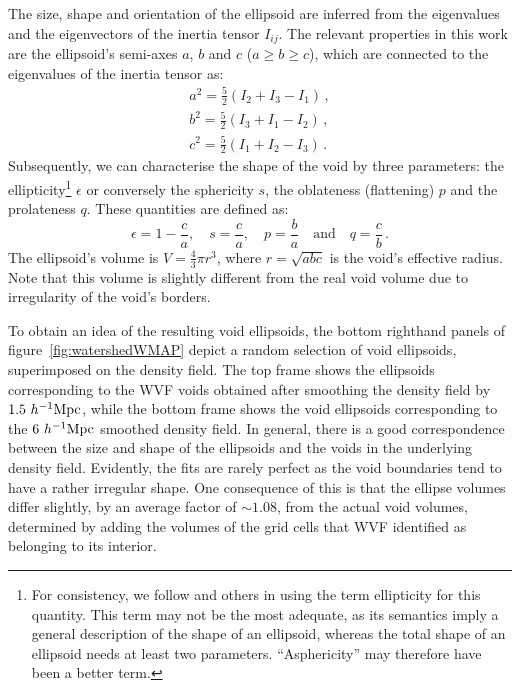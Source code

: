 The size, shape and orientation of the ellipsoid are inferred from the eigenvalues and the eigenvectors 
of the inertia tensor $I_{ij}$. The relevant properties in this work are the ellipsoid's semi-axes $a$, $b$ and $c$
($a \geq b \geq c$), which are connected to the eigenvalues of the inertia tensor as:
\begin{align}
a^2 = \frac{5}{2}\left(I_2 + I_3 - I_1\right) \,,\\
b^2 = \frac{5}{2}\left(I_3 + I_1 - I_2\right) \,,\\
c^2 = \frac{5}{2}\left(I_1 + I_2 - I_3\right) \,.
\end{align}
Subsequently, we can characterise the shape of the void by three parameters: the ellipticity\footnote{For consistency, we 
follow \citet{parklee07} and others in using the term ellipticity for this quantity. This term may not be the most adequate, 
as its semantics imply a general description of the shape of an ellipsoid, whereas the total shape of an ellipsoid needs at 
least two parameters. ``Asphericity'' may therefore have been a better term.} $\epsilon$ or conversely the sphericity $s$, the 
oblateness (flattening) $p$ and the prolateness $q$. These quantities are defined as:
\begin{equation}
\label{eqn:shape_parameters}
\epsilon = 1 - \frac{c}{a}\mathrm{,} \quad s = \frac{c}{a}\mathrm{,} \quad p = \frac{b}{a} \quad \mathrm{and} \quad q = \frac{c}{b} \,.
\end{equation}
The ellipsoid's volume is $V = \frac{4}{3} \pi r^3$, where $r = \sqrt{abc}$ is the void's effective radius. Note that this volume 
is slightly different from the real void volume due to irregularity of the void's borders.

To obtain an idea of the resulting void ellipsoids, the bottom righthand panels of figure~\ref{fig:watershedWMAP} depict a random selection 
of void ellipsoids, superimposed on the density field. The top frame shows the ellipsoids corresponding to the WVF voids obtained after 
smoothing the density field by $1.5~h^{-1} {\rm Mpc}$, while the bottom frame shows the void ellipsoids corresponding to the $6 ~h^{-1} {\rm Mpc}$ smoothed 
density field. In general, there is a good correspondence between the size and shape of the ellipsoids and the voids in the underlying 
density field. Evidently, the fits are rarely perfect as the void boundaries tend to have a rather irregular shape. One consequence of this 
is that the ellipse volumes differ slightly, by an average factor of $\sim 1.08$, from the actual void volumes, determined by adding 
the volumes of the grid cells that WVF identified as belonging to its interior. 

